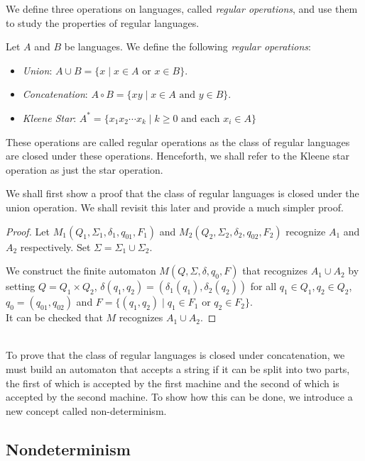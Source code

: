 We define three operations on languages, called \textit{regular operations}, and use them to study the properties of regular languages.

\begin{definition}
Let $A$ and $B$ be languages. We define the following \textit{regular operations}:
\begin{itemize}
    \item \textit{Union}: $A\cup B=\{x\mid x\in A \text{ or }x\in B\}$.
    \item \textit{Concatenation}: $A\circ B=\{xy\mid x\in A\text{ and }y\in B\}$.
    \item \textit{Kleene Star}: $A^*=\{x_1x_2\cdots x_k\mid k\geq 0\text{ and each }x_i\in A\}$
\end{itemize}
\end{definition}

These operations are called regular operations as the class of regular languages are closed under these operations. Henceforth, we shall refer to the Kleene star operation as just the star operation.

\vspace{2mm}
We shall first show a proof that the class of regular languages is closed under the union operation. We shall revisit this later and provide a much simpler proof.
\begin{proof}
Let $M_1(Q_1,\Sigma_1,\delta_1,q_{01},F_1)$ and $M_2(Q_2,\Sigma_2,\delta_2,q_{02},F_2)$ recognize $A_1$ and $A_2$ respectively. Set $\Sigma=\Sigma_1\cup\Sigma_2$.

We construct the finite automaton $M(Q,\Sigma,\delta,q_0,F)$ that recognizes $A_1\cup A_2$ by setting $Q=Q_1\times Q_2$, $\delta(q_1, q_2)=(\delta_1(q_1), \delta_2(q_2))$ for all $q_1\in Q_1,q_2\in Q_2$, $q_0=(q_{01}, q_{02})$ and $F=\{(q_1, q_2)\mid q_1\in F_1 \text{ or }q_2\in F_2\}$.\\
It can be checked that $M$ recognizes $A_1\cup A_2$.
\end{proof}
~\\
To prove that the class of regular languages is closed under concatenation, we must build an automaton that accepts a string if it can be split into two parts, the first of which is accepted by the first machine and the second of which is accepted by the second machine. To show how this can be done, we introduce a new concept called non-determinism.
\clearpage

\subsection{Nondeterminism}

